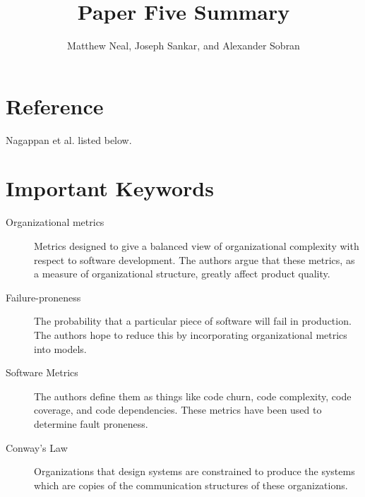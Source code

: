 \documentclass[english]{article}
\begin{document}
\title{Paper Five Summary}


\author{Matthew Neal, Joseph Sankar, and Alexander Sobran}

\maketitle

\section*{Reference}

Nagappan et al. \cite{Nagappan} listed below.


\section*{Important Keywords}
\begin{description}
\item [{Organizational metrics}] Metrics designed to give a balanced view of organizational complexity with respect to software development. The authors argue that these metrics, as a measure of organizational structure, greatly affect product quality.
\item[{Failure-proneness}] The probability that a particular piece of software will fail in production. The authors hope to reduce this by incorporating organizational metrics into models.
\item[{Software Metrics}]  The authors define them as things like code churn, code complexity, code coverage, and code dependencies.  These metrics have been used to determine fault proneness.
\item[{Conway's Law}] Organizations that design systems are constrained to produce the systems which are copies of the communication structures of these organizations.
\end{description}
\end{document}
